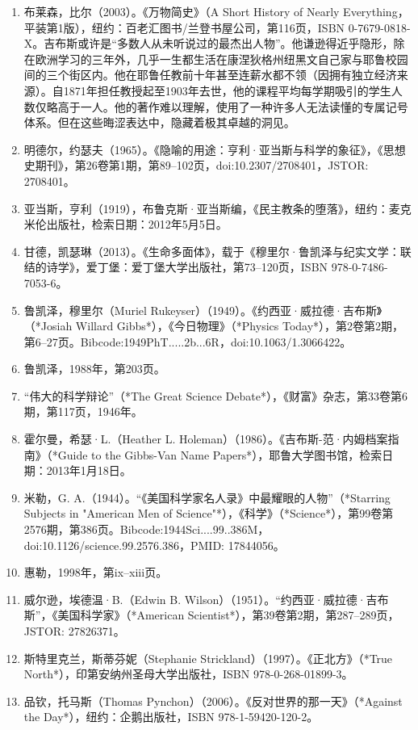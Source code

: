 \begin{enumerate}
\item 布莱森，比尔（2003）。《万物简史》（A Short History of Nearly Everything，平装第1版），纽约：百老汇图书/兰登书屋公司，第116页，ISBN 0-7679-0818-X。吉布斯或许是“多数人从未听说过的最杰出人物”。他谦逊得近乎隐形，除在欧洲学习的三年外，几乎一生都生活在康涅狄格州纽黑文自己家与耶鲁校园间的三个街区内。他在耶鲁任教前十年甚至连薪水都不领（因拥有独立经济来源）。自1871年担任教授起至1903年去世，他的课程平均每学期吸引的学生人数仅略高于一人。他的著作难以理解，使用了一种许多人无法读懂的专属记号体系。但在这些晦涩表达中，隐藏着极其卓越的洞见。
\item 明德尔，约瑟夫（1965）。《隐喻的用途：亨利·亚当斯与科学的象征》，《思想史期刊》，第26卷第1期，第89–102页，doi:10.2307/2708401，JSTOR: 2708401。
\item 亚当斯，亨利（1919），布鲁克斯·亚当斯编，《民主教条的堕落》，纽约：麦克米伦出版社，检索日期：2012年5月5日。
\item 甘德，凯瑟琳（2013）。《生命多面体》，载于《穆里尔·鲁凯泽与纪实文学：联结的诗学》，爱丁堡：爱丁堡大学出版社，第73–120页，ISBN 978-0-7486-7053-6。
\item 鲁凯泽，穆里尔（Muriel Rukeyser）（1949）。《约西亚·威拉德·吉布斯》（*Josiah Willard Gibbs*），《今日物理》（*Physics Today*），第2卷第2期，第6–27页。Bibcode:1949PhT.....2b...6R，doi:10.1063/1.3066422。
\item 鲁凯泽，1988年，第203页。
\item “伟大的科学辩论”（*The Great Science Debate*），《财富》杂志，第33卷第6期，第117页，1946年。
\item 霍尔曼，希瑟·L.（Heather L. Holeman）（1986）。《吉布斯-范·内姆档案指南》（*Guide to the Gibbs-Van Name Papers*），耶鲁大学图书馆，检索日期：2013年1月18日。
\item 米勒，G. A.（1944）。“《美国科学家名人录》中最耀眼的人物”（*Starring Subjects in "American Men of Science"*），《科学》（*Science*），第99卷第2576期，第386页。Bibcode:1944Sci....99..386M，doi:10.1126/science.99.2576.386，PMID: 17844056。
\item 惠勒，1998年，第ix–xiii页。
\item 威尔逊，埃德温·B.（Edwin B. Wilson）（1951）。“约西亚·威拉德·吉布斯”，《美国科学家》（*American Scientist*），第39卷第2期，第287–289页，JSTOR: 27826371。
\item 斯特里克兰，斯蒂芬妮（Stephanie Strickland）（1997）。《正北方》（*True North*），印第安纳州圣母大学出版社，ISBN 978-0-268-01899-3。
\item 品钦，托马斯（Thomas Pynchon）（2006）。《反对世界的那一天》（*Against the Day*），纽约：企鹅出版社，ISBN 978-1-59420-120-2。

\end{enumerate}

